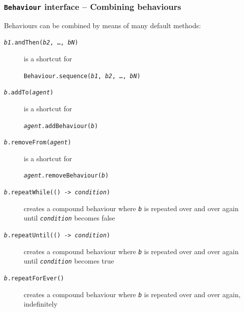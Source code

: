 \documentclass[presentation]{beamer}\mode<presentation>{\usetheme{AMSCesenaPurpleAndGold}}
\begin{document}
\begin{frame}[allowframebreaks]
    \frametitle{\texttt{Behaviour} interface -- Combining behaviours}

    Behaviours can be combined by means of many \alert{default} methods:
    \bigskip
    \begin{description}
        \item[\texttt{\textit{b1}.andThen(\textit{b2}, \ldots, \textit{bN})}] is a shortcut for
        \begin{center}
            \texttt{Behaviour.sequence(\textit{b1}, \textit{b2}, \ldots, \textit{bN})}
        \end{center}

        \bigskip

        \item[\texttt{\textit{b}.addTo(\textit{agent})}] is a shortcut for
        \begin{center}
            \texttt{\textit{agent}.addBehaviour(\textit{b})}
        \end{center}

        \bigskip

        \item[\texttt{\textit{b}.removeFrom(\textit{agent})}] is a shortcut for
        \begin{center}
            \texttt{\textit{agent}.removeBehaviour(\textit{b})}
        \end{center}

        \framebreak

        \item[\texttt{\textit{b}.repeatWhile(() -> \textit{condition})}] creates a compound behaviour where
        \texttt{\textit{b}} is repeated over and over again until \texttt{\textit{condition}} becomes false

        \bigskip

        \item[\texttt{\textit{b}.repeatUntil(() -> \textit{condition})}] creates a compound behaviour where
        \texttt{\textit{b}} is repeated over and over again until \texttt{\textit{condition}} becomes true

        \bigskip

        \item[\texttt{\textit{b}.repeatForEver()}] creates a compound behaviour where
        \texttt{\textit{b}} is repeated over and over again, indefinitely
    \end{description}
\end{frame}
\end{document}
